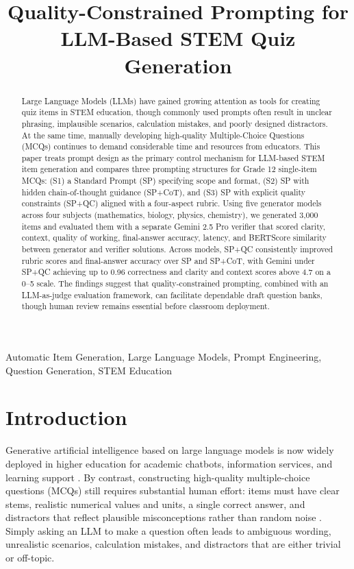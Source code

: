 \documentclass[a4paper,conference]{IEEEtran}
\begin{document}
\title{Quality-Constrained Prompting for LLM-Based STEM Quiz Generation}


\maketitle

\begin{abstract}
Large Language Models (LLMs) have gained growing attention as tools for creating quiz items in STEM education, though commonly used prompts often result in unclear phrasing, implausible scenarios, calculation mistakes, and poorly designed distractors. At the same time, manually developing high-quality Multiple-Choice Questions (MCQs) continues to demand considerable time and resources from educators. This paper treats prompt design as the primary control mechanism for LLM-based STEM item generation and compares three prompting structures for Grade 12 single-item MCQs: (S1) a Standard Prompt (SP) specifying scope and format, (S2) SP with hidden chain-of-thought guidance (SP+CoT), and (S3) SP with explicit quality constraints (SP+QC) aligned with a four-aspect rubric. Using five generator models across four subjects (mathematics, biology, physics, chemistry), we generated 3,000 items and evaluated them with a separate Gemini 2.5 Pro verifier that scored clarity, context, quality of working, final-answer accuracy, latency, and BERTScore similarity between generator and verifier solutions. Across models, SP+QC consistently improved rubric scores and final-answer accuracy over SP and SP+CoT, with Gemini under SP+QC achieving up to 0.96 correctness and clarity and context scores above 4.7 on a 0–5 scale. The findings suggest that quality-constrained prompting, combined with an LLM-as-judge evaluation framework, can facilitate dependable draft question banks, though human review remains essential before classroom deployment.
\end{abstract}

\renewcommand{\IEEEkeywordsname}{Keywords}
\begin{IEEEkeywords}
Automatic Item Generation, Large Language Models, Prompt Engineering, Question Generation, STEM Education
\end{IEEEkeywords}

\section{Introduction}

Generative artificial intelligence based on large language models is now widely deployed in higher education for academic chatbots, information services, and learning support \cite{muna2025siakif,genAIHigherEdu}. By contrast, constructing high-quality multiple-choice questions (MCQs) still requires substantial human effort: items must have clear stems, realistic numerical values and units, a single correct answer, and distractors that reflect plausible misconceptions rather than random noise \cite{rahmah2020}. Simply asking an LLM to make a question often leads to ambiguous wording, unrealistic scenarios, calculation mistakes, and distractors that are either trivial or off-topic. 
\end{document}
